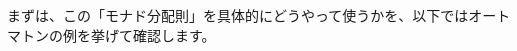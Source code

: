 \documentclass[
		head_space=20mm,
		foot_space=20mm,
		gutter=10mm,
		line_length=190mm
]{jlreq}
\begin{document}



\noindent まずは、この「モナド分配則」を具体的にどうやって使うかを、以下ではオートマトンの例を挙げて確認します。\vspace{-10pt}

\subsubsection*{}
\label{subsec:Kleisli-approach}
\end{document}
